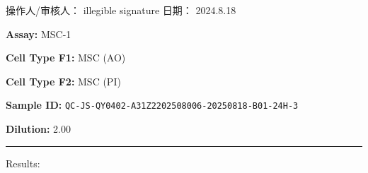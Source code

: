 \documentclass[UTF8,10pt,a4paper,fontset=fandol]{ctexart}
\newcommand{\fieldvalue}[1]{#1}
\newcommand{\handwritten}[1]{#1}
\begin{document}
\vfill

\noindent 操作人/审核人：
\fieldvalue{\handwritten{illegible signature}}
\hfill
日期：
\fieldvalue{\handwritten{2024.8.18}}

\newpage

\noindent
\textbf{Assay:}
\fieldvalue{MSC-1}

\vspace{0.5em}
\noindent
\textbf{Cell Type F1:}
\fieldvalue{MSC (AO)}

\vspace{0.25em}
\noindent
\textbf{Cell Type F2:}
\fieldvalue{MSC (PI)}

\vspace{0.5em}
\noindent
\textbf{Sample ID:}
\fieldvalue{\texttt{QC-JS-QY0402-A31Z2202508006-20250818-B01-24H-3}}

\vspace{0.25em}
\noindent
\textbf{Dilution:}
\fieldvalue{2.00}

\vspace{1em}
\noindent\rule{\linewidth}{0.4pt}

\noindent Results:
\end{document}
